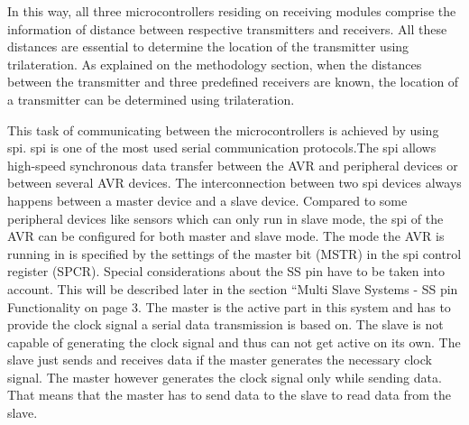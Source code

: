 In this way, all three microcontrollers residing on receiving modules comprise the information of distance between respective transmitters and receivers. All these distances are essential to determine the location of the transmitter using trilateration. As explained on the methodology section, when the distances between the transmitter and three predefined receivers are known, the location of a transmitter can be determined using trilateration.

This task of communicating between the microcontrollers is achieved by using \gls{spi}. \gls{spi} is one of the most used serial communication protocols.The \gls{spi} allows high-speed synchronous data transfer between the AVR and peripheral devices or between several AVR devices. The interconnection between two \gls{spi} devices always happens between a master device and a slave device. Compared to some peripheral devices like sensors which can only run in slave mode, the \gls{spi} of the AVR can be configured for both master and slave mode. The mode the AVR is running in is specified by the settings of the master bit (MSTR) in the \gls{spi} control register (SPCR). Special considerations about the SS pin have to be taken into account. This will be described later in the section “Multi Slave Systems - SS pin Functionality on page 3. The master is the active part in this system and has to provide the clock signal a serial data transmission is based on. The slave is not capable of generating the clock signal and thus can not get active on its own. The slave just sends and receives data if the master generates the necessary clock signal. The master however generates the clock signal only while sending data. That means that the master has to send data to the slave to read data from the slave.

